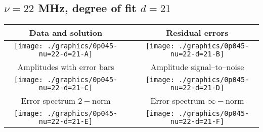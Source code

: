 

% 

\clearpage{}
\break{}

\subsection{$\nu = 22$ MHz, degree of fit $d = 21$}

\begin{table}[h]
    \begin{center}
        \begin{tabular}{ccc}
            Data and solution & \quad & Residual errors \\\hline
            \texttt{[image: ./graphics/0p045-nu=22-d=21-A]} &&
            \texttt{[image: ./graphics/0p045-nu=22-d=21-B]} \\[15pt]
            Amplitudes with error bars && Amplitude signal--to--noise \\\hline
            \texttt{[image: ./graphics/0p045-nu=22-d=21-C]} &&
            \texttt{[image: ./graphics/0p045-nu=22-d=21-D]} \\[15pt]
            Error spectrum $2-$norm && Error spectrum $\infty-$norm \\\hline
            \texttt{[image: ./graphics/0p045-nu=22-d=21-E]} &&
            \texttt{[image: ./graphics/0p045-nu=22-d=21-F]} \\[15pt]
        \end{tabular}
    \end{center}
\label{fig:elev=45, nu=22}
\end{table}



\endinput
